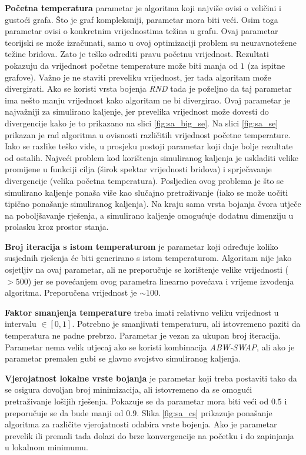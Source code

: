 \documentclass[times, utf8, diplomski, numeric]{fer}
\begin{document}
\textbf{Početna temperatura} parametar je algoritma koji najviše ovisi o veličini i gustoći grafa. Što je graf kompleksniji, parametar mora biti veći. Osim toga parametar ovisi o konkretnim vrijednostima težina u grafu. Ovaj parametar teorijski se može izračunati, samo u ovoj optimizaciji problem su neuravnotežene težine bridova. Zato je teško odrediti pravu početnu vrijednost. Rezultati pokazuju da vrijednost početne temperature može biti manja od $1$ (za ispitne grafove). Važno je ne staviti preveliku vrijednost, jer tada algoritam može divergirati. Ako se koristi vrsta bojenja \emph{RND} tada je poželjno da taj parametar ima nešto manju vrijednost kako algoritam ne bi divergirao. Ovaj parametar je najvažniji za simulirano kaljenje, jer prevelika vrijednost može dovesti do divergencije kako je to prikazano na slici \ref{fig:sa_big_se}. Na slici \ref{fig:sa_se} prikazan je rad algoritma u ovisnosti različitih vrijednost početne temperature. Iako se razlike teško vide, u prosjeku postoji parametar koji daje bolje rezultate od ostalih. Najveći problem kod korištenja simuliranog kaljenja je uskladiti velike promijene u funkciji cilja (širok spektar vrijednosti bridova) i sprječavanje divergencije (velika početna temperatura). Posljedica ovog problema je što se simulirano kaljenje ponaša više kao slučajno pretraživanje (iako se može uočiti tipično ponašanje simuliranog kaljenja). Na kraju sama vrsta bojanja čvora utječe na poboljšavanje rješenja, a simulirano kaljenje omogućuje dodatnu dimenziju u prolasku kroz prostor stanja.

\textbf{Broj iteracija s istom temperaturom} je parametar koji određuje koliko susjednih rješenja će biti generirano s istom temperaturom. Algoritam nije jako osjetljiv na ovaj parametar, ali ne preporučuje se korištenje velike vrijednosti ($>500$) jer se povećanjem ovog parametra linearno povećava i vrijeme izvođenja algoritma. Preporučena vrijednost je $\sim 100$.

\textbf{Faktor smanjenja temperature} treba imati relativno veliku vrijednost u intervalu $\in[0,1]$. Potrebno je smanjivati temperaturu, ali istovremeno paziti da temperatura ne padne prebrzo. Parametar je vezan za ukupan broj iteracija. Parametar nema velik utjecaj ako se koristi kombinacija \emph{ABW-SWAP}, ali ako je parametar premalen gubi se glavno svojstvo simuliranog kaljenja.

\textbf{Vjerojatnost lokalne vrste bojanja} je parametar koji treba postaviti tako da se osigura dovoljan broj minimizacija, ali istovremeno da se omogući pretraživanje lošijih rješenja. Pokazuje se da parametar mora biti veći od $0.5$ i preporučuje se da bude manji od $0.9$. Slika \ref{fig:sa_cs} prikazuje ponašanje algoritma za različite vjerojatnosti odabira vrste bojenja. Ako je parametar prevelik ili premali tada dolazi do brze konvergencije na početku i do zapinjanja u lokalnom minimumu.
\end{document}
